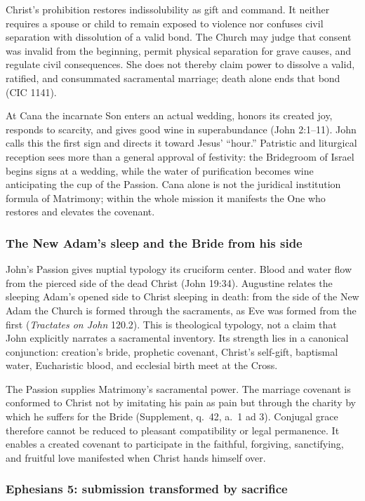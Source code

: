 Christ's prohibition restores indissolubility as gift and command. It neither requires a spouse or child to remain exposed to violence nor confuses civil separation with dissolution of a valid bond. The Church may judge that consent was invalid from the beginning, permit physical separation for grave causes, and regulate civil consequences. She does not thereby claim power to dissolve a valid, ratified, and consummated sacramental marriage; death alone ends that bond (CIC 1141).

At Cana the incarnate Son enters an actual wedding, honors its created joy, responds to scarcity, and gives good wine in superabundance (John 2:1--11). John calls this the first sign and directs it toward Jesus' ``hour.'' Patristic and liturgical reception sees more than a general approval of festivity: the Bridegroom of Israel begins signs at a wedding, while the water of purification becomes wine anticipating the cup of the Passion. Cana alone is not the juridical institution formula of Matrimony; within the whole mission it manifests the One who restores and elevates the covenant.

\subsubsection{The New Adam's sleep and the Bride from his side}

John's Passion gives nuptial typology its cruciform center. Blood and water flow from the pierced side of the dead Christ (John 19:34). Augustine relates the sleeping Adam's opened side to Christ sleeping in death: from the side of the New Adam the Church is formed through the sacraments, as Eve was formed from the first (\emph{Tractates on John} 120.2). This is theological typology, not a claim that John explicitly narrates a sacramental inventory. Its strength lies in a canonical conjunction: creation's bride, prophetic covenant, Christ's self-gift, baptismal water, Eucharistic blood, and ecclesial birth meet at the Cross.

The Passion supplies Matrimony's sacramental power. The marriage covenant is conformed to Christ not by imitating his pain as pain but through the charity by which he suffers for the Bride (Supplement, q.~42, a.~1 ad 3). Conjugal grace therefore cannot be reduced to pleasant compatibility or legal permanence. It enables a created covenant to participate in the faithful, forgiving, sanctifying, and fruitful love manifested when Christ hands himself over.

\subsubsection{Ephesians 5: submission transformed by sacrifice}

